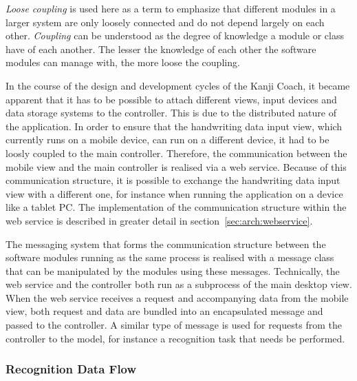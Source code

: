 \emph{Loose coupling} is used here as a term to emphasize that different modules 
in a larger system are only loosely connected and do not depend largely on each 
other. \emph{Coupling} can be understood as the degree of knowledge a module or 
class have of each another. The lesser the knowledge of each other the software 
modules can manage with, the more loose the coupling.

In the course of the design and development cycles of the Kanji Coach, 
it became apparent that it has to be possible to attach different views, 
input devices and data storage systems to the controller. This is due to the 
distributed nature of the application. 
In order to ensure that the handwriting data input view, which currently runs 
on a mobile device, can run on a different device, it had to be loosly coupled 
to the main controller. Therefore, the communication between the mobile view 
and the main controller is realised via a web service. 
Because of this communication structure, it is possible to exchange the 
handwriting data input view with a different one, for instance when running 
the application on a device like a tablet PC. The implementation of the 
communication structure within the web service is described in greater detail 
in section~\ref{sec:arch:webservice}.

The messaging system that forms the communication structure between the software 
modules running as the same process is realised with a message class that
can be manipulated by the modules using these messages.
Technically, the web service and the controller both run as a subprocess of the 
main desktop view. When the web service receives a request and accompanying data
from the mobile view, both request and data are bundled into an encapsulated
message and passed to the controller. A similar type of message is used for 
requests from the controller to the model, for instance a recognition task that 
needs be performed.

\subsubsection{Recognition Data Flow}
\label{sec:arch:recognitiondataflow}

